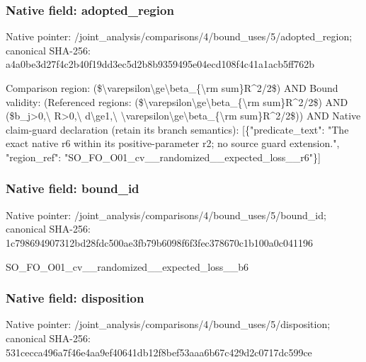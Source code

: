 \documentclass[10pt,a4paper]{article}
\begin{document}
\subsubsection{Native field: adopted\_\allowbreak{}region}
Native pointer: /joint\_\allowbreak{}analysis/comparisons/4/bound\_\allowbreak{}uses/5/adopted\_\allowbreak{}region; canonical SHA-256: a4a0be3d27f4c2b40f19dd3ec5d2b8b9359495e04ecd108f4c41a1acb5ff762b

\begingroup\raggedright\sloppy Comparison region:\allowbreak{} (\$\textbackslash{}varepsilon\textbackslash{}ge\textbackslash{}beta\_\allowbreak{}\{\textbackslash{}rm sum\}R\textasciicircum{}2/\allowbreak{}2\$) AND Bound validity:\allowbreak{} (Referenced regions:\allowbreak{} (\$\textbackslash{}varepsilon\textbackslash{}ge\textbackslash{}beta\_\allowbreak{}\{\textbackslash{}rm sum\}R\textasciicircum{}2/\allowbreak{}2\$) AND (\$b\_\allowbreak{}j>0,\allowbreak{}\textbackslash{} R>0,\allowbreak{}\textbackslash{} d\textbackslash{}ge1,\allowbreak{}\textbackslash{} \textbackslash{}varepsilon\textbackslash{}ge\textbackslash{}beta\_\allowbreak{}\{\textbackslash{}rm sum\}R\textasciicircum{}2/\allowbreak{}2\$)) AND Native claim-guard declaration (retain its branch semantics):\allowbreak{} [\{"predicate\_\allowbreak{}text":\allowbreak{} "The exact native r6 within its positive-parameter r2;\allowbreak{} no source guard extension.",\allowbreak{} "region\_\allowbreak{}ref":\allowbreak{} "SO\_\allowbreak{}FO\_\allowbreak{}O01\_\allowbreak{}cv\_\allowbreak{}\_\allowbreak{}randomized\_\allowbreak{}\_\allowbreak{}expected\_\allowbreak{}loss\_\allowbreak{}\_\allowbreak{}r6"\}]\par\endgroup

\subsubsection{Native field: bound\_\allowbreak{}id}
Native pointer: /joint\_\allowbreak{}analysis/comparisons/4/bound\_\allowbreak{}uses/5/bound\_\allowbreak{}id; canonical SHA-256: 1c798694907312bd28fdc500ae3fb79b6098f6f3fec378670c1b100a0c041196

\begingroup\raggedright\sloppy SO\_\allowbreak{}FO\_\allowbreak{}O01\_\allowbreak{}cv\_\allowbreak{}\_\allowbreak{}randomized\_\allowbreak{}\_\allowbreak{}expected\_\allowbreak{}loss\_\allowbreak{}\_\allowbreak{}b6\par\endgroup

\subsubsection{Native field: disposition}
Native pointer: /joint\_\allowbreak{}analysis/comparisons/4/bound\_\allowbreak{}uses/5/disposition; canonical SHA-256: 531cecca496a7f46e4aa9ef40641db12f8bef53aaa6b67c429d2c0717dc599ce
\end{document}
